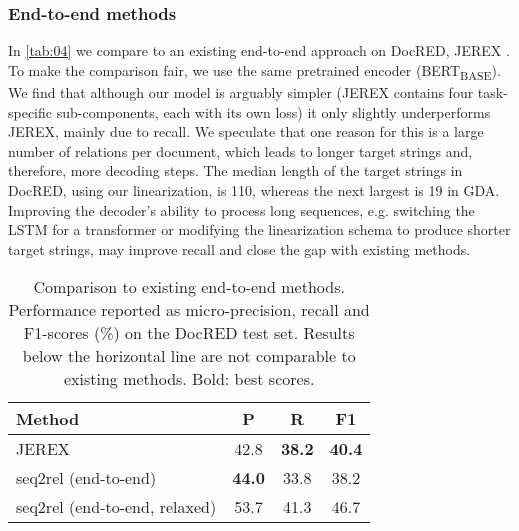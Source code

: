 \documentclass[11pt]{article}
\begin{document}
\subsubsection{End-to-end methods}
\label{existing-end-to-end-methods}

In \autoref{tab:04} we compare to an existing end-to-end approach on DocRED, JEREX \citep{eberts-ulges-2021-end}. To make the comparison fair, we use the same pretrained encoder (BERT\textsubscript{BASE}). We find that
although our model is arguably simpler (JEREX contains four task-specific sub-components, each with its own loss)
it only slightly underperforms JEREX, mainly due to recall. We speculate that one reason for this is a large number of relations per document, which leads to longer target strings and, therefore, more decoding steps. The median length of the target strings in DocRED, using our linearization, is 110, whereas the next largest is 19 in GDA. Improving the decoder's ability to process long sequences, e.g. switching the LSTM for a transformer or modifying the linearization schema to produce shorter target strings, may improve recall and close the gap with existing methods.

\begin{table}[t]
\centering
\caption{Comparison to existing end-to-end methods. Performance reported as micro-precision, recall and F1-scores (\%) on the DocRED test set. Results below the horizontal line are not comparable to existing methods. Bold: best scores.}
\label{tab:04}
\small
\begin{tabular}{@{}lccc@{}}
\toprule
Method                              & P             & R             & F1            \\ \midrule
JEREX \citep{eberts-ulges-2021-end} & 42.8          & \textbf{38.2} & \textbf{40.4} \\
seq2rel (end-to-end)                & \textbf{44.0} & 33.8          & 38.2          \\ \midrule
seq2rel (end-to-end, relaxed)       & 53.7          & 41.3          & 46.7          \\ \bottomrule
\end{tabular}
\end{table}
\end{document}
